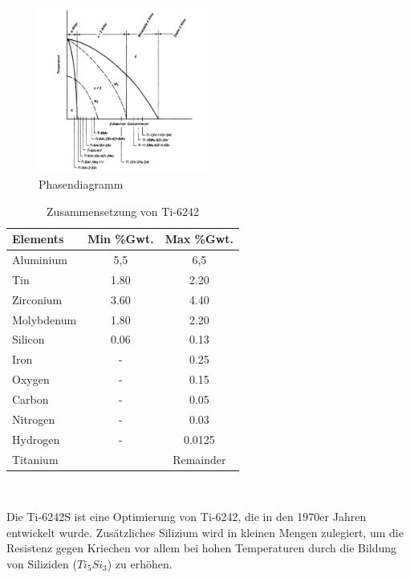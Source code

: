 \begin{figure}[H]
	\centering
	\includegraphics[width=0.5\textwidth]{Bilder/Phasendiagram}
	\caption{Phasendiagramm \cite{M.J.Donachie.2010}}
	\label{tab:PD-Ti6242}
\end{figure}





\begin{table}[H]
	
	\centering	
	\begin{tabular}{|l |c |c|}
		\hline
		\hspace{20ex}Elements \hspace{20ex} & Min \%Gwt. & Max \%Gwt.\\
		\hline
		Aluminium&5,5&6,5\\
		Tin&1.80&2.20\\
		Zirconium&3.60&4.40\\
		Molybdenum&1.80&2.20\\
		Silicon &0.06&0.13\\
		Iron&-&0.25\\
		Oxygen&-&0.15\\
		Carbon&	-&	0.05\\
		Nitrogen&-&0.03\\
		Hydrogen&-&0.0125\\
		
		Titanium &&Remainder\\
		\hline
	\end{tabular}
	\caption{Zusammensetzung von Ti-6242 \cite{M.J.Donachie.2010}}
	\label{tab:Zusammensetzung}
\end{table}
\

Die Ti-6242S ist eine Optimierung von Ti-6242, die in den 1970er Jahren  entwickelt wurde. Zusätzliches Silizium wird in kleinen Mengen zulegiert, um die Resistenz gegen Kriechen vor allem bei hohen Temperaturen durch die Bildung von Siliziden ($Ti_5Si_3$) zu erhöhen. \cite{C.Leyens.2005} 

